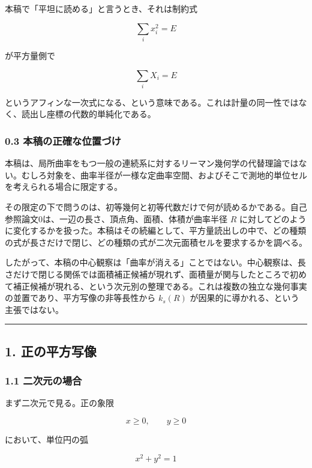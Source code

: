 \documentclass[
]{ltjsarticle}
\begin{document}
本稿で「平坦に読める」と言うとき、それは制約式

\[
\sum_i x_i^2=E
\]

が平方量側で

\[
\sum_i X_i=E
\]

というアフィンな一次式になる、という意味である。これは計量の同一性ではなく、読出し座標の代数的単純化である。

\subsubsection{0.3
本稿の正確な位置づけ}\label{ux672cux7a3fux306eux6b63ux78baux306aux4f4dux7f6eux3065ux3051}

本稿は、局所曲率をもつ一般の連続系に対するリーマン幾何学の代替理論ではない。むしろ対象を、曲率半径が一様な定曲率空間、およびそこで測地的単位セルを考えられる場合に限定する。

その限定の下で問うのは、初等幾何と初等代数だけで何が読めるかである。自己参照論文0は、一辺の長さ、頂点角、面積、体積が曲率半径
\(R\)
に対してどのように変化するかを扱った。本稿はその続編として、平方量読出しの中で、どの種類の式が長さだけで閉じ、どの種類の式が二次元面積セルを要求するかを調べる。

したがって、本稿の中心観察は「曲率が消える」ことではない。中心観察は、長さだけで閉じる関係では面積補正候補が現れず、面積量が関与したところで初めて補正候補が現れる、という次元別の整理である。これは複数の独立な幾何事実の並置であり、平方写像の非等長性から
\(k_s(R)\) が因果的に導かれる、という主張ではない。

\begin{center}\rule{0.5\linewidth}{0.5pt}\end{center}

\subsection{1. 正の平方写像}\label{ux6b63ux306eux5e73ux65b9ux5199ux50cf}

\subsubsection{1.1
二次元の場合}\label{ux4e8cux6b21ux5143ux306eux5834ux5408}

まず二次元で見る。正の象限

\[
x\ge 0,\qquad y\ge 0
\]

において、単位円の弧

\[
x^2+y^2=1
\]
\end{document}

